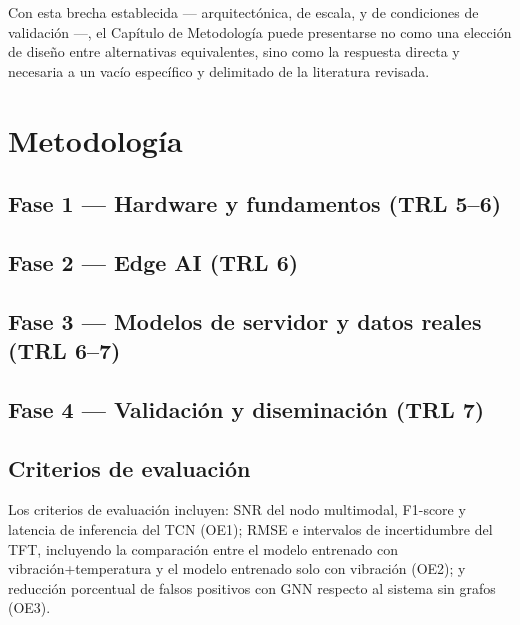\documentclass[11pt]{article}
\begin{document}
Con esta brecha establecida --- arquitectónica, de escala, y de condiciones de validación ---, el Capítulo de Metodología puede presentarse no como una elección de diseño entre alternativas equivalentes, sino como la respuesta directa y necesaria a un vacío específico y delimitado de la literatura revisada.

\section{Metodología}
\label{sec:metodologia}

\subsection{Fase 1 --- Hardware y fundamentos (TRL 5--6)}

\subsection{Fase 2 --- Edge AI (TRL 6)}

\subsection{Fase 3 --- Modelos de servidor y datos reales (TRL 6--7)}

\subsection{Fase 4 --- Validación y diseminación (TRL 7)}

\subsection{Criterios de evaluación}
Los criterios de evaluación incluyen: SNR del nodo multimodal, F1-score y latencia de inferencia del TCN (OE1); RMSE e intervalos de incertidumbre del TFT, incluyendo la comparación entre el modelo entrenado con vibración+temperatura y el modelo entrenado solo con vibración (OE2); y reducción porcentual de falsos positivos con GNN respecto al sistema sin grafos (OE3).
\end{document}
